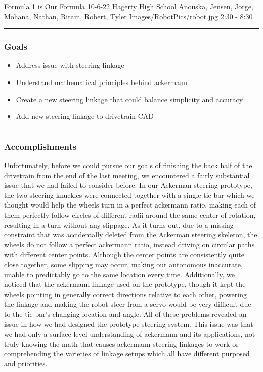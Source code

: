 \insertmeeting 
	{Formula 1 is Our Formula} 
	{10-6-22} 
	{Hagerty High School}
	{Anouska, Jensen, Jorge, Mohana, Nathan, Ritam, Robert, Tyler}
	{Images/RobotPics/robot.jpg}
	{2:30 - 8:30}
	
\noindent\hfil\rule{\textwidth}{.4pt}\hfil
\subsubsection*{Goals}
\begin{itemize}
    \item Address issue with steering linkage
    \item Understand mathematical principles behind ackermann
    \item Create a new steering linkage that could balance simplicity and accuracy
    \item Add new steering linkage to drivetrain CAD




\end{itemize} 

\noindent\hfil\rule{\textwidth}{.4pt}\hfil

\subsubsection*{Accomplishments}
Unfortunately, before we could pursue our goals of finishing the back half of the drivetrain from the end of the last meeting, we encountered a fairly substantial issue that we had failed to consider before. In our Ackerman steering prototype, the two steering knuckles were connected together with a single tie bar which we thought would help the wheels turn in a perfect ackermann ratio, making each of them perfectly follow circles of different radii around the same center of rotation, resulting in a turn without any slippage. As it turns out, due to a missing constraint that was accidentally deleted from the Ackerman steering skeleton, the wheels do not follow a perfect ackermann ratio, instead driving on circular paths with different center points. Although the center points are consistently quite close together, some slipping may occur, making our autonomous inaccurate, unable to predictably go to the same location every time. Additionally, we noticed that the ackermann linkage used on the prototype, though it kept the wheels pointing in generally correct directions relative to each other, powering the linkage and making the robot steer from a servo would be very difficult due to the tie bar’s changing location and angle. All of these problems revealed an issue in how we had designed the prototype steering system. This issue was that we had only a surface-level understanding of ackermann and its applications, not truly knowing the math that causes ackermann steering linkages to work or comprehending the varieties of linkage setups which all have different purposed and priorities. 

